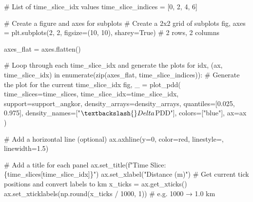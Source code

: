 \documentclass[
  11pt,
  letterpaper,
  DIV=11,
  numbers=noendperiod]{scrartcl}
\newenvironment{Shaded}{\begin{snugshade}}{\end{snugshade}}
\newcommand{\BuiltInTok}[1]{\textcolor[rgb]{0.00,0.23,0.31}{#1}}
\newcommand{\CommentTok}[1]{\textcolor[rgb]{0.37,0.37,0.37}{#1}}
\newcommand{\ControlFlowTok}[1]{\textcolor[rgb]{0.00,0.23,0.31}{#1}}
\newcommand{\DecValTok}[1]{\textcolor[rgb]{0.68,0.00,0.00}{#1}}
\newcommand{\FloatTok}[1]{\textcolor[rgb]{0.68,0.00,0.00}{#1}}
\newcommand{\KeywordTok}[1]{\textcolor[rgb]{0.00,0.23,0.31}{#1}}
\newcommand{\NormalTok}[1]{\textcolor[rgb]{0.00,0.23,0.31}{#1}}
\newcommand{\OperatorTok}[1]{\textcolor[rgb]{0.37,0.37,0.37}{#1}}
\newcommand{\SpecialCharTok}[1]{\textcolor[rgb]{0.37,0.37,0.37}{#1}}
\newcommand{\SpecialStringTok}[1]{\textcolor[rgb]{0.13,0.47,0.30}{#1}}
\newcommand{\StringTok}[1]{\textcolor[rgb]{0.13,0.47,0.30}{#1}}
\newcommand{\VariableTok}[1]{\textcolor[rgb]{0.07,0.07,0.07}{#1}}
\begin{document}
\begin{Shaded}
\begin{Highlighting}[]
\CommentTok{\# List of time\_slice\_idx values}
\NormalTok{time\_slice\_indices }\OperatorTok{=}\NormalTok{ [}\DecValTok{0}\NormalTok{, }\DecValTok{2}\NormalTok{, }\DecValTok{4}\NormalTok{, }\DecValTok{6}\NormalTok{]}

\CommentTok{\# Create a figure and axes for subplots}
\CommentTok{\# Create a 2x2 grid of subplots}
\NormalTok{fig, axes }\OperatorTok{=}\NormalTok{ plt.subplots(}\DecValTok{2}\NormalTok{, }\DecValTok{2}\NormalTok{, figsize}\OperatorTok{=}\NormalTok{(}\DecValTok{10}\NormalTok{, }\DecValTok{10}\NormalTok{), sharey}\OperatorTok{=}\VariableTok{True}\NormalTok{)  }\CommentTok{\# 2 rows, 2 columns}

\NormalTok{axes\_flat }\OperatorTok{=}\NormalTok{ axes.flatten()}

\CommentTok{\# Loop through each time\_slice\_idx and generate the plots}
\ControlFlowTok{for}\NormalTok{ idx, (ax, time\_slice\_idx) }\KeywordTok{in} \BuiltInTok{enumerate}\NormalTok{(}\BuiltInTok{zip}\NormalTok{(axes\_flat, time\_slice\_indices)):}
    \CommentTok{\# Generate the plot for the current time\_slice\_idx}
\NormalTok{    fig, \_ }\OperatorTok{=}\NormalTok{ plot\_pdd(}
\NormalTok{        time\_slices}\OperatorTok{=}\NormalTok{time\_slices,}
\NormalTok{        time\_slice\_idx}\OperatorTok{=}\NormalTok{time\_slice\_idx,}
\NormalTok{        support}\OperatorTok{=}\NormalTok{support\_angkor,}
\NormalTok{        density\_arrays}\OperatorTok{=}\NormalTok{density\_arrays,}
\NormalTok{        quantiles}\OperatorTok{=}\NormalTok{[}\FloatTok{0.025}\NormalTok{, }\FloatTok{0.975}\NormalTok{],}
\NormalTok{        density\_names}\OperatorTok{=}\NormalTok{[}\StringTok{"$\textbackslash{}Delta$PDD"}\NormalTok{],}
\NormalTok{        colors}\OperatorTok{=}\NormalTok{[}\StringTok{"blue"}\NormalTok{],}
\NormalTok{        ax}\OperatorTok{=}\NormalTok{ax}
\NormalTok{    )}
    
    \CommentTok{\# Add a horizontal line (optional)}
\NormalTok{    ax.axhline(y}\OperatorTok{=}\DecValTok{0}\NormalTok{, color}\OperatorTok{=}\StringTok{\textquotesingle{}red\textquotesingle{}}\NormalTok{, linestyle}\OperatorTok{=}\StringTok{\textquotesingle{}{-}{-}\textquotesingle{}}\NormalTok{, linewidth}\OperatorTok{=}\FloatTok{1.5}\NormalTok{)}
    
    \CommentTok{\# Add a title for each panel}
\NormalTok{    ax.set\_title(}\SpecialStringTok{f"Time Slice: }\SpecialCharTok{\{}\NormalTok{time\_slices[time\_slice\_idx]}\SpecialCharTok{\}}\SpecialStringTok{"}\NormalTok{)}
\NormalTok{    ax.set\_xlabel(}\StringTok{"Distance (m)"}\NormalTok{)}
    \CommentTok{\# Get current tick positions and convert labels to km}
\NormalTok{    x\_ticks }\OperatorTok{=}\NormalTok{ ax.get\_xticks()}
\NormalTok{    ax.set\_xticklabels(np.}\BuiltInTok{round}\NormalTok{(x\_ticks }\OperatorTok{/} \DecValTok{1000}\NormalTok{, }\DecValTok{1}\NormalTok{))  }\CommentTok{\# e.g. 1000 → 1.0 km}


\end{Highlighting}
\end{Shaded}
\end{document}
